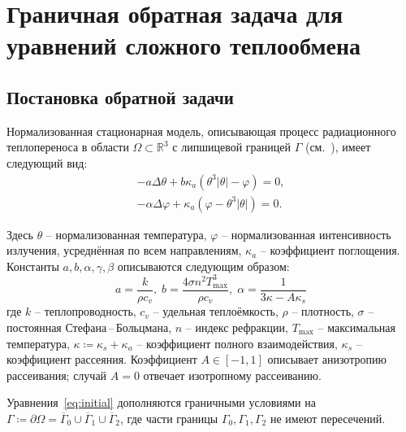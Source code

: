 \section{Граничная обратная задача для уравнений сложного теплообмена}\label{sec:ch2_sec1}

\subsection{Постановка обратной задачи}\label{subsec:1_1_init}

Нормализованная стационарная модель, описывающая процесс радиационного теплопереноса в
области $\Omega \subset \mathbb{R}^3$ с липшицевой границей $\Gamma$ (см.~\cite{OControl_1}), имеет следующий вид:
\begin{equation}
    \label{eq:initial}
    \begin{aligned}
        - a \Delta \theta + b \kappa_a(\theta ^ 3 | \theta | - \varphi) = 0,  \\
        - \alpha \Delta \varphi + \kappa_a (\varphi - \theta ^3 | \theta |) = 0.
    \end{aligned}
\end{equation}

Здесь $\theta$ -- нормализованная температура, $\varphi$ -- нормализованная интенсивность излучения,
усреднённая по всем направлениям, $\kappa_a$ -- коэффициент поглощения.
Константы $a, b, \alpha, \gamma, \beta$ описываются следующим образом:
\[
    a = \frac{k}{\rho c_v}, \; b = \frac{4 \sigma n^2 T^3_{\max}}{\rho c_v}, \;
    \alpha = \frac{1}{3\kappa -A \kappa_s}
\]
где $k$ -- теплопроводность, $c_v$ -- удельная теплоёмкость, $\rho$ -- плотность,
$\sigma$ -- постоянная Стефана\,--\,Больцмана, $n$ -- индекс рефракции,
$T_{\max}$ -- максимальная температура,
$\kappa \coloneqq \kappa_s + \kappa_a$ -- коэффициент полного взаимодействия,
$\kappa_s$ -- коэффициент рассеяния.
Коэффициент $A \in [-1,1]$ описывает анизотропию рассеивания;
случай $A=0$ отвечает изотропному рассеиванию.

Уравнения~\eqref{eq:initial} дополняются граничными условиями на
$\Gamma \coloneqq \partial \Omega =\overline{\Gamma}_0 \cup \overline{\Gamma}_1 \cup \overline{\Gamma}_2$,
где части границы $\Gamma_0, \Gamma_1, \Gamma_2$ не имеют пересечений.


